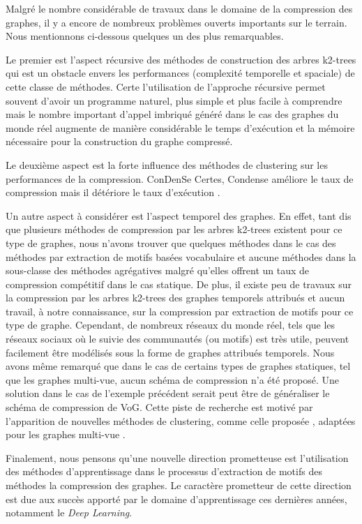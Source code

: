 								Malgré le nombre considérable de travaux dans
le domaine de la compression des graphes, il y a encore
de nombreux problèmes ouverts importants sur le terrain. Nous mentionnons ci-dessous quelques un des plus remarquables.
 

Le premier est l'aspect récursive des méthodes de construction des arbres k2-trees qui est un obstacle envers les performances (complexité temporelle et spaciale) de cette classe de méthodes. Certe l'utilisation de l'approche récursive permet souvent d'avoir un programme naturel, plus simple et plus facile à comprendre mais le nombre important d'appel imbriqué généré dans le cas des graphes du monde réel augmente de manière considérable le temps d'exécution et la mémoire nécessaire pour la construction du graphe compressé. 

Le deuxième aspect est la forte influence des méthodes de clustering sur les performances de la compression. \gls{ConDenSe} Certes, Condense améliore le taux de compression mais il détériore le taux d'exécution \citep{liu2018reducing}.

Un autre aspect à considérer est l'aspect temporel des graphes. En effet, tant dis que plusieurs méthodes de compression par les arbres k2-trees existent pour ce type de graphes, nous n'avons trouver que quelques méthodes dans le cas des méthodes par extraction de motifs basées vocabulaire et aucune méthodes dans la sous-classe des méthodes agrégatives malgré qu'elles offrent un taux de compression compétitif dans le cas statique. De plus, il existe peu de travaux sur la compression par les arbres k2-trees des graphes temporels attribués et aucun travail, à notre connaissance, sur la compression par extraction de motifs pour ce type de graphe. Cependant, de nombreux réseaux du monde réel, tels que les réseaux sociaux où le suivie des communautés (ou motifs) est très utile, peuvent facilement être modélisés sous la forme de graphes attribués temporels. Nous avons même remarqué que dans le cas de certains types de graphes statiques, tel que les graphes multi-vue, aucun schéma de compression n'a été proposé. Une solution dans le cas de l'exemple précédent serait peut être de généraliser le schéma de compression de VoG. Cette piste de recherche est motivé par l'apparition de nouvelles méthodes de clustering, comme celle proposée \citep{wang2019study}, adaptées pour les graphes multi-vue .


Finalement, nous pensons qu'une nouvelle direction prometteuse est l'utilisation des méthodes d'apprentissage dans le processus d'extraction de motifs des méthodes la compression des graphes. Le caractère prometteur de cette direction est due aux succès apporté par le domaine d'apprentissage ces dernières années, notamment le \textit{Deep Learning}. %
								

